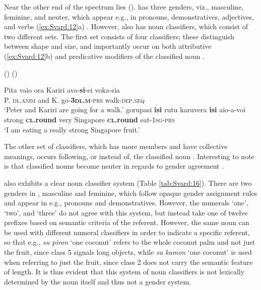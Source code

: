 \documentclass[output=collectionpaper]{langsci/langscibook}
\begin{document}
Near the other end of the spectrum lies  ().  has three genders, viz., masculine, feminine, and neuter, which appear e.g., in pronouns, demonstratives, adjectives, and verbs (\ref{ex:Svard:12}a) \citep{Robinson2011}. However,  also has noun classifiers, which consist of two different sets. The first set consists of four classifiers; these distinguish between shape and size, and importantly occur on both attributive (\ref{ex:Svard:12}b) and predicative modifiers of the classified noun \citep[50]{Robinson2011}.


\ea
\label{ex:Svard:12}
 () (\citealt[149, 50]{Robinson2011})\\
\begin{xlist}
\ex
\gll Pita vaio ora Kariri ava-\textbf{si}{}-ei voka-sia\\
     P. \textsc{dl.anim} and K. go-\textsc{\textbf{3dl.m}}\textsc{{}-prs} walk-\textsc{dep.seq}\\
\glt `Peter and Kariri are going for a walk.'
\ex
\gll gorupasi \textbf{isi} rutu karuvera \textbf{isi} aio-a-voi\\
     strong \textsc{\textbf{cl.}}\textbf{round} very Singapore \textsc{\textbf{cl}}\textbf{.round} eat-\textsc{1sg-prs}\\
\glt `I am eating a really strong Singapore fruit.'
\end{xlist}
\z


The other set of classifiers, which has more members and have collective meanings, occurs following, or instead of, the classified noun \citep[51]{Robinson2011}. Interesting to note is that classified nouns become neuter in regards to gender agreement \citep[53]{Robinson2011}.


 also exhibits a clear noun classifier system (Table \ref{tab:Svard:16}). There are two genders in , masculine and feminine, which follow opaque gender assignment rules and appear in e.g., pronouns and demonstratives. However, the numerals `one', `two', and `three' do not agree with this system, but instead take one of twelve prefixes based on semantic criteria of the referent. However, the same noun can be used with different numeral classifiers in order to indicate a specific referent, so that e.g., \textit{su piron} `one coconut' refers to the whole coconut palm and not just the fruit, since class 5 signals long objects, while \textit{su kamon} `one coconut' is used when referring to just the fruit, since class 2 does not carry the semantic feature of length. It is thus evident that this system of noun classifiers is not lexically determined by the noun itself and thus not a gender system.
\end{document}
